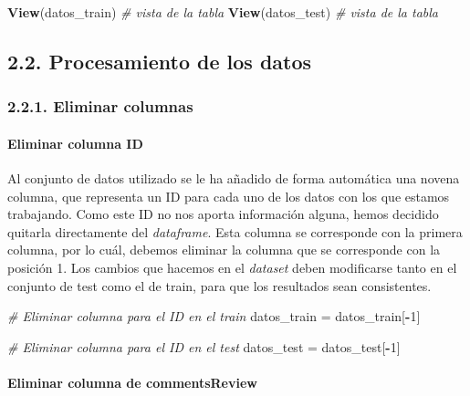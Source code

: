 \documentclass[spanish,]{article}
\newenvironment{Shaded}{\begin{snugshade}}{\end{snugshade}}
\newcommand{\KeywordTok}[1]{\textcolor[rgb]{0.13,0.29,0.53}{\textbf{#1}}}
\newcommand{\DecValTok}[1]{\textcolor[rgb]{0.00,0.00,0.81}{#1}}
\newcommand{\StringTok}[1]{\textcolor[rgb]{0.31,0.60,0.02}{#1}}
\newcommand{\CommentTok}[1]{\textcolor[rgb]{0.56,0.35,0.01}{\textit{#1}}}
\newcommand{\OperatorTok}[1]{\textcolor[rgb]{0.81,0.36,0.00}{\textbf{#1}}}
\newcommand{\NormalTok}[1]{#1}
\let\oldparagraph\paragraph
\renewcommand{\paragraph}[1]{\oldparagraph{#1}\mbox{}}
\begin{document}
\begin{Shaded}
\begin{Highlighting}[]
\KeywordTok{View}\NormalTok{(datos_train)    }\CommentTok{# vista de la tabla}
\KeywordTok{View}\NormalTok{(datos_test)    }\CommentTok{# vista de la tabla}
\end{Highlighting}
\end{Shaded}

\subsection{2.2. Procesamiento de los
datos}\label{procesamiento-de-los-datos}

\subsubsection{2.2.1. Eliminar columnas}\label{eliminar-columnas}

\paragraph{Eliminar columna ID}\label{eliminar-columna-id}

Al conjunto de datos utilizado se le ha añadido de forma automática una
novena columna, que representa un ID para cada uno de los datos con los
que estamos trabajando. Como este ID no nos aporta información alguna,
hemos decidido quitarla directamente del \emph{dataframe}. Esta columna
se corresponde con la primera columna, por lo cuál, debemos eliminar la
columna que se corresponde con la posición 1. Los cambios que hacemos en
el \emph{dataset} deben modificarse tanto en el conjunto de test como el
de train, para que los resultados sean consistentes.

\begin{Shaded}
\begin{Highlighting}[]
\CommentTok{# Eliminar columna para el ID en el train}
\NormalTok{datos_train =}\StringTok{ }\NormalTok{datos_train[}\OperatorTok{-}\DecValTok{1}\NormalTok{]}

\CommentTok{# Eliminar columna para el ID en el test}
\NormalTok{datos_test =}\StringTok{ }\NormalTok{datos_test[}\OperatorTok{-}\DecValTok{1}\NormalTok{]}
\end{Highlighting}
\end{Shaded}

\paragraph{Eliminar columna de
commentsReview}\label{eliminar-columna-de-commentsreview}
\end{document}
